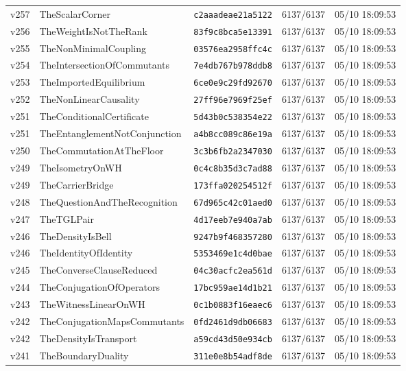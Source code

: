 \documentclass[11pt]{article}
\theoremstyle{definition}\newtheorem{deriv}{Derivation}
\begin{document}
{\begin{longtable}{@{}lllll@{}}
v257 & TheScalarCorner & \texttt{c2aaadeae21a5122} & 6137/6137 & 05/10 18:09:53 \\
v256 & TheWeightIsNotTheRank & \texttt{83f9c8bca5e13391} & 6137/6137 & 05/10 18:09:53 \\
v255 & TheNonMinimalCoupling & \texttt{03576ea2958ffc4c} & 6137/6137 & 05/10 18:09:53 \\
v254 & TheIntersectionOfCommutants & \texttt{7e4db767b978ddb8} & 6137/6137 & 05/10 18:09:53 \\
v253 & TheImportedEquilibrium & \texttt{6ce0e9c29fd92670} & 6137/6137 & 05/10 18:09:53 \\
v252 & TheNonLinearCausality & \texttt{27ff96e7969f25ef} & 6137/6137 & 05/10 18:09:53 \\
v251 & TheConditionalCertificate & \texttt{5d43b0c538354e22} & 6137/6137 & 05/10 18:09:53 \\
v251 & TheEntanglementNotConjunction & \texttt{a4b8cc089c86e19a} & 6137/6137 & 05/10 18:09:53 \\
v250 & TheCommutationAtTheFloor & \texttt{3c3b6fb2a2347030} & 6137/6137 & 05/10 18:09:53 \\
v249 & TheIsometryOnWH & \texttt{0c4c8b35d3c7ad88} & 6137/6137 & 05/10 18:09:53 \\
v249 & TheCarrierBridge & \texttt{173ffa020254512f} & 6137/6137 & 05/10 18:09:53 \\
v248 & TheQuestionAndTheRecognition & \texttt{67d965c42c01aed0} & 6137/6137 & 05/10 18:09:53 \\
v247 & TheTGLPair & \texttt{4d17eeb7e940a7ab} & 6137/6137 & 05/10 18:09:53 \\
v246 & TheDensityIsBell & \texttt{9247b9f468357280} & 6137/6137 & 05/10 18:09:53 \\
v246 & TheIdentityOfIdentity & \texttt{5353469e1c4d0bae} & 6137/6137 & 05/10 18:09:53 \\
v245 & TheConverseClauseReduced & \texttt{04c30acfc2ea561d} & 6137/6137 & 05/10 18:09:53 \\
v244 & TheConjugationOfOperators & \texttt{17bc959ae14d1b21} & 6137/6137 & 05/10 18:09:53 \\
v243 & TheWitnessLinearOnWH & \texttt{0c1b0883f16eaec6} & 6137/6137 & 05/10 18:09:53 \\
v242 & TheConjugationMapsCommutants & \texttt{0fd2461d9db06683} & 6137/6137 & 05/10 18:09:53 \\
v242 & TheDensityIsTransport & \texttt{a59cd43d50e934cb} & 6137/6137 & 05/10 18:09:53 \\
v241 & TheBoundaryDuality & \texttt{311e0e8b54adf8de} & 6137/6137 & 05/10 18:09:53 \\

\end{longtable}}
\end{document}
